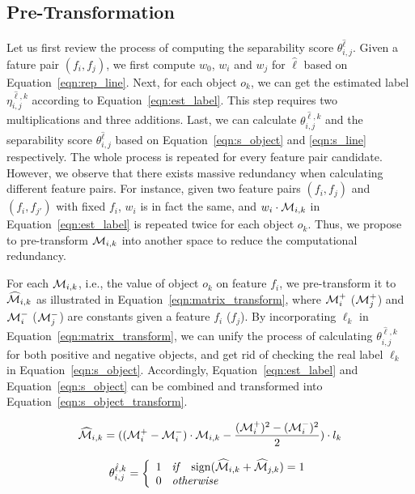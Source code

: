 \subsection{Pre-Transformation} \label{ssec:trans}
 Let us first review the process of computing the separability score $\theta_{i,j}^{\hat{\ell}}$. Given a fature pair $(f_i,f_j)$, we first compute $w_0$, $w_i$ and $w_j$ for $\hat{\ell}$ based on Equation~\ref{eqn:rep_line}. Next, for each object $o_k$, we can get the estimated label $\eta_{i,j}^{\hat{\ell},k}$ according to Equation~\ref{eqn:est_label}. This step requires two multiplications and three additions. Last, we can calculate $\theta_{i,j}^{\hat{\ell},k}$ and the separability score $\theta_{i,j}^{\hat{\ell}}$ based on Equation~\ref{eqn:s_object} and \ref{eqn:s_line} respectively. The whole process is repeated for every feature pair candidate. However, we observe that there exists massive redundancy when calculating different feature pairs. For instance, given two feature pairs $(f_i,f_j)$ and $(f_i,f_{j'})$ with fixed $f_i$, $w_i$ is in fact the same, and $w_i\cdot \mm_{i,k}$ in Equation~\ref{eqn:est_label} is repeated twice for each object $o_k$. Thus, we propose to pre-transform $\mm_{i,k}$ into another space to reduce the computational redundancy.

 For each $\mm_{i,k}$, i.e., the value of object $o_k$ on feature $f_i$, we pre-transform it to $\widehat{\mm}_{i,k}$ as illustrated in Equation~\ref{eqn:matrix_transform}, where $\mm_i^+$ ($\mm_j^+$) and $\mm_i^-$ ($\mm_j^-$) are constants given a feature $f_i$ ($f_j$). By incorporating $\ell_k$ in Equation~\ref{eqn:matrix_transform}, we can unify the process of calculating $\theta_{i,j}^{\hat{\ell},k}$ for both positive and negative objects, and get rid of checking the real label $\ell_k$ in Equation~\ref{eqn:s_object}. Accordingly, Equation~\ref{eqn:est_label} and Equation~\ref{eqn:s_object} can be combined and transformed into Equation~\ref{eqn:s_object_transform}.

\begin{equation}\label{eqn:matrix_transform}
\widehat{\mm}_{i,k} = ((\mm_i^+-\mm_i^-)\cdot \mm_{i,k}-\frac{(\mm_i^+)^2-(\mm_i^-)^2}{2})\cdot l_k 
\end{equation}

\begin{equation}\label{eqn:s_object_transform}
\theta_{i,j}^{\hat{\ell},k}=\left\{
                \begin{array}{ll}
                  1 \textit{\hspace{2mm} if \hspace{2mm}} \sign(\widehat{\mm}_{i,k} + \widehat{\mm}_{j,k}) = 1\\
                  0 \textit{\hspace{2mm} otherwise \hspace{2mm}} 
                \end{array}
              \right.
\end{equation}

